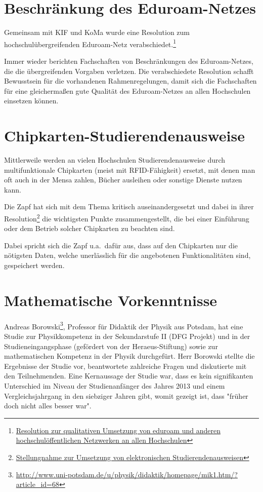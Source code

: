 \documentclass{scrartcl}
\begin{document}
\section*{Beschränkung des Eduroam-Netzes}

Gemeinsam mit KIF und KoMa wurde eine Resolution zum hochschulübergreifenden
Eduroam-Netz verabschiedet.\footnote{\href{https://vmp.ethz.ch/zapfwiki/images/2/27/Resolution\_SoSe15\_Netzneutralit\%C3\%A4t\_in\_Universit\%C3\%A4tsnetzen.pdf}{Resolution zur qualitativen Umsetzung von eduroam und anderen hochschulöffentlichen Netzwerken an allen Hochschulen}}

Immer wieder berichten Fachschaften von Beschränkungen des Eduroam-Netzes, die
die übergreifenden Vorgaben verletzen. Die verabschiedete Resolution schafft 
Bewusstsein für die vorhandenen Rahmenregelungen, damit sich die Fachschaften
für eine gleichermaßen gute Qualität des Eduroam-Netzes an allen Hochschulen
einsetzen können.

\section*{Chipkarten-Studierendenausweise}

Mittlerweile werden an vielen Hochschulen Studierendenausweise durch
multifunktionale Chipkarten (meist mit RFID-Fähigkeit) ersetzt, mit denen man
oft auch in der Mensa zahlen, Bücher ausleihen oder sonstige Dienste nutzen
kann.

Die Zapf hat sich mit dem Thema kritisch auseinandergesetzt und dabei in ihrer
Resolution\footnote{\href{https://vmp.ethz.ch/zapfwiki/images/4/4a/Resolution\_SoSe15\_Umsetzung\_von\_elektronischen\_Studierendenausweisen.pdf}{Stellungnahme zur Umsetzung von elektronischen Studierendenausweisen}} die wichtigsten Punkte zusammengestellt, die bei einer
Einführung oder dem Betrieb solcher Chipkarten zu beachten sind.

Dabei spricht sich die Zapf u.a.\ dafür aus, dass auf den Chipkarten nur die
nötigsten Daten, welche unerlässlich für die angebotenen Funktionalitäten sind,
gespeichert werden.

\section*{Mathematische Vorkenntnisse}

Andreas Borowski\footnote{\href{http://www.uni-potsdam.de/u/physik/didaktik/homepage/mik1.htm/?article\_id=68}{\url{http://www.uni-potsdam.de/u/physik/didaktik/homepage/mik1.htm/?article\_id=68}}},
Professor für Didaktik der Physik aus Potsdam, hat eine Studie zur Physikkompetenz
in der Sekundarstufe II (DFG Projekt) und in der Studieneingangsphase
(gefördert von der Heraeus-Stiftung) sowie zur mathematischen Kompetenz in
der Physik durchgefürt. Herr Borowski stellte die Ergebnisse der Studie vor, beantwortete zahlreiche Fragen und diskutierte mit den Teilnehmenden. Eine Kernaussage der Studie war, dass es kein signifikanten Unterschied im Niveau der Studienanfänger des Jahres 2013 und einem Vergleichsjahrgang in den siebziger Jahren gibt, womit gezeigt ist, dass "früher doch nicht alles besser war".
\end{document}
